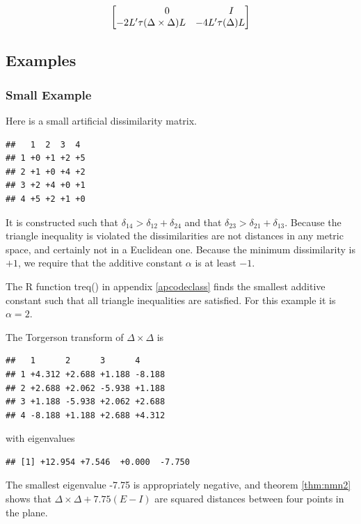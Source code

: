 \documentclass[
  12pt,
]{book}
\theoremstyle{definition}
\theoremstyle{definition}
\theoremstyle{definition}
\theoremstyle{definition}
\theoremstyle{remark}
\begin{document}
\begin{equation}
\begin{bmatrix}
\hfill 0&\hfill I\\
-2L'\tau(\Delta\times\Delta)L&-4L'\tau(\Delta)L
\end{bmatrix}
\label{eq:qep3}
\end{equation}

\hypertarget{examples}{%
\subsection{Examples}\label{examples}}

\hypertarget{small-example}{%
\subsubsection{Small Example}\label{small-example}}

Here is a small artificial dissimilarity matrix.

\begin{verbatim}
##   1  2  3  4 
## 1 +0 +1 +2 +5
## 2 +1 +0 +4 +2
## 3 +2 +4 +0 +1
## 4 +5 +2 +1 +0
\end{verbatim}

It is constructed such that \(\delta_{14}>\delta_{12}+\delta_{24}\) and
that \(\delta_{23}>\delta_{21}+\delta_{13}\). Because the triangle
inequality is violated the dissimilarities are not distances in any
metric space, and certainly not in a Euclidean one. Because the minimum
dissimilarity is \(+1\), we require that the additive constant \(\alpha\) is
at least \(-1\).

The R function treq() in appendix \ref{apcodeclass} finds the smallest
additive constant such that all triangle inequalities are satisfied. For
this example it is \(\alpha=2\).

The Torgerson transform of \(\Delta\times\Delta\) is

\begin{verbatim}
##   1      2      3      4     
## 1 +4.312 +2.688 +1.188 -8.188
## 2 +2.688 +2.062 -5.938 +1.188
## 3 +1.188 -5.938 +2.062 +2.688
## 4 -8.188 +1.188 +2.688 +4.312
\end{verbatim}

with eigenvalues

\begin{verbatim}
## [1] +12.954 +7.546  +0.000  -7.750
\end{verbatim}

The smallest eigenvalue -7.75 is appropriately negative, and
theorem \ref{thm:nmn2} shows that \(\Delta\times\Delta+7.75(E-I)\)
are squared distances between four points in the plane.
\end{document}
